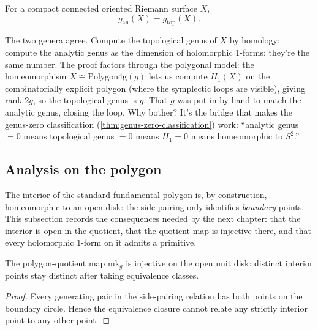 \begin{theorem}
\label{thm:analytic-eq-topological-genus}
For a compact connected oriented Riemann surface \(X\),
\[
  g_{\mathrm{an}}(X) = g_{\mathrm{top}}(X).
\]
\notready
\end{theorem}

\begin{layman}
The two genera agree. Compute the topological genus of \(X\) by
homology; compute the analytic genus as the dimension of
holomorphic 1-forms; they're the same number. The proof factors
through the polygonal model: the homeomorphism \(X\cong
\mathrm{Polygon4g}(g)\) lets us compute \(H_1(X)\) on the
combinatorially explicit polygon (where the symplectic loops are
visible), giving rank \(2g\), so the topological genus is \(g\).
That \(g\) was put in by hand to match the analytic genus, closing
the loop. Why bother? It's the bridge that makes the
genus-zero classification (\ref{thm:genus-zero-classification})
work: ``analytic genus \(=0\) means topological genus \(=0\) means
\(H_1=0\) means homeomorphic to \(S^2\).''
\end{layman}

\subsection{Analysis on the polygon}

The interior of the standard fundamental polygon is, by construction,
homeomorphic to an open disk: the side-pairing only identifies
\emph{boundary} points. This subsection records the consequences
needed by the next chapter: that the interior is open in the
quotient, that the quotient map is injective there, and that every
holomorphic 1-form on it admits a primitive.

\begin{lemma}
\label{lem:mk-injOn-openDisk}
The polygon-quotient map \(\mathrm{mk}_g\) is injective on the open
unit disk: distinct interior points stay distinct after taking
equivalence classes.
\leanok
\end{lemma}
\begin{proof}\leanok
Every generating pair in the side-pairing relation has both points on
the boundary circle. Hence the equivalence closure cannot relate any
strictly interior point to any other point.
\end{proof}

